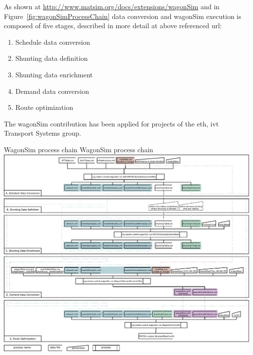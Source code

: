 As shown at \url{http://www.matsim.org/docs/extensions/wagonSim} and in Figure~\ref{fig:wagonSimProcessChain} data conversion and wagonSim execution is composed of five stages, described in more detail at above referenced url:
%
\begin{enumerate}[label=\emph{\Alph*})]
\item Schedule data conversion
\item Shunting data definition
\item Shunting data enrichment
\item Demand data conversion
\item Route optimization
\end{enumerate}
%
The wagonSim \gls{contribution} has been applied for projects of the \gls{eth}, \gls{ivt} Transport Systems group.

\createfigure%
{WagonSim process chain}%
{WagonSim process chain}%
{\label{fig:wagonSimProcessChain}}%
{\includegraphics[width=1.22\textwidth,angle=90]{extending/figures/wagonsim/processChainsCompact}}%
{}

